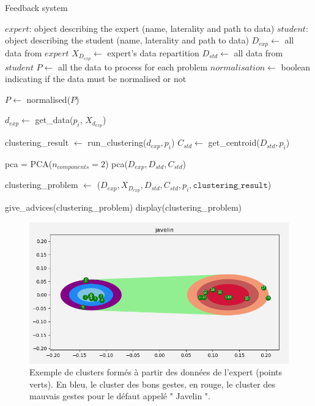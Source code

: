 \begin{algorithm}[h]
\caption{Feedback system}
\begin{algorithmic}[1]
\State $expert$: object describing the expert (name, laterality and path to data)
\State $student$: object describing the student (name, laterality and path to data)
\State $D_{exp} \gets$ all data from $expert$
\State $X_{D_{exp}} \gets$ expert's data repartition
\State $D_{std} \gets$ all data from $student$
\State $P \gets$ all the data to process for each problem
\State $normalisation \gets$ boolean indicating if the data must be normalised or not

    	\State $P \gets$ normalised($P$)
    \EndIf

    	\State $d_{exp} \gets$ get\_data($p_i$, $X_{d_{exp}}$)

    	\State clustering\_result $\gets$ run\_clustering($d_{exp}, p_i$)
    	\State $C_{std} \gets$ get\_centroid($D_{std}, p_i$)

    		\State pca = PCA($n_{components}=2$)
    		\State pca($D_{exp}, D_{std}, C_{std}$)
    	\EndIf

		\State clustering\_problem $\gets$ ($D_{exp}, X_{D_{exp}}, D_{std}, C_{std}, p_i, \texttt{clustering\_result}$)
    \EndFor

    \State give\_advices(clustering\_problem)
    \State display(clustering\_problem)
 \EndProcedure
 \end{algorithmic}
 \label{algorithm_Feedback}
\end{algorithm}

\begin{figure}[h]
	\centering
    \includegraphics[width=\textwidth]{pictures/feedback_expert_cluster_example.png}
    \caption[Clusters formés par les données de l'expert]{Exemple de clusters formés à partir des données de l'expert (points verts). En bleu, le cluster des bons gestes, en rouge, le cluster des mauvais gestes pour le défaut appelé " Javelin ".}
    \label{fig:feedback_expert_cluster_example}
\end{figure}


